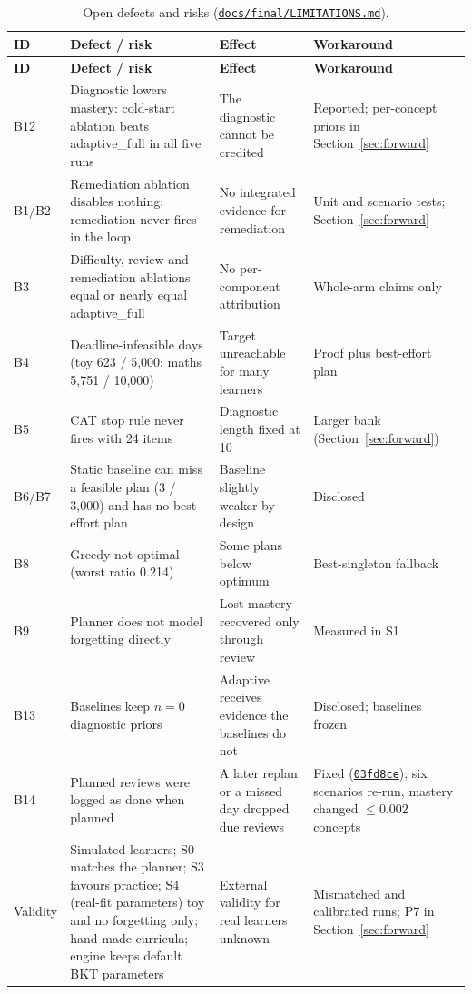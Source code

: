 \documentclass[english]{sintr}
\newcommand{\repourl}{https://github.com/Bhuvan-56/adaptive-learning-path-planner-DAT}
\newcommand{\sha}{cs5903-final-2026}
\DeclareRobustCommand{\rf}[1]{\href{\repourl/blob/\sha/#1}{\nolinkurl{#1}}}
\DeclareRobustCommand{\cm}[1]{\href{\repourl/commit/#1}{\texttt{#1}}}
\begin{document}
{\small
\begin{longtable}{|C{1.20cm}|L{5.17cm}|L{4.16cm}|L{4.06cm}|}
\caption{Open defects and risks (\rf{docs/final/LIMITATIONS.md}).}\\
\hline
\textbf{ID} & \textbf{Defect / risk} & \textbf{Effect} & \textbf{Workaround} \\ \hline
\endfirsthead
\hline \textbf{ID} & \textbf{Defect / risk} & \textbf{Effect} & \textbf{Workaround} \\ \hline
\endhead
B12 & Diagnostic lowers mastery: cold-start ablation beats adaptive\_full in all five runs & The diagnostic cannot be credited & Reported; per-concept priors in Section~\ref{sec:forward} \\ \hline
B1/B2 & Remediation ablation disables nothing; remediation never fires in the loop & No integrated evidence for remediation & Unit and scenario tests; Section~\ref{sec:forward} \\ \hline
B3 & Difficulty, review and remediation ablations equal or nearly equal adaptive\_full & No per-component attribution & Whole-arm claims only \\ \hline
B4 & Deadline-infeasible days (toy 623 / 5,000; maths 5,751 / 10,000) & Target unreachable for many learners & Proof plus best-effort plan \\ \hline
B5 & CAT stop rule never fires with 24 items & Diagnostic length fixed at 10 & Larger bank (Section~\ref{sec:forward}) \\ \hline
B6/B7 & Static baseline can miss a feasible plan (3 / 3,000) and has no best-effort plan & Baseline slightly weaker by design & Disclosed \\ \hline
B8 & Greedy not optimal (worst ratio 0.214) & Some plans below optimum & Best-singleton fallback \\ \hline
B9 & Planner does not model forgetting directly & Lost mastery recovered only through review & Measured in S1 \\ \hline
B13 & Baselines keep $n=0$ diagnostic priors & Adaptive receives evidence the baselines do not & Disclosed; baselines frozen \\ \hline
B14 & Planned reviews were logged as done when planned & A later replan or a missed day dropped due reviews & Fixed (\cm{03fd8ce}); six scenarios re-run, mastery changed $\le 0.002$ concepts \\ \hline
Validity & Simulated learners; S0 matches the planner; S3 favours practice; S4 (real-fit parameters) toy and no forgetting only; hand-made curricula; engine keeps default BKT parameters & External validity for real learners unknown & Mismatched and calibrated runs; P7 in Section~\ref{sec:forward} \\ \hline
\end{longtable}
}
\end{document}
